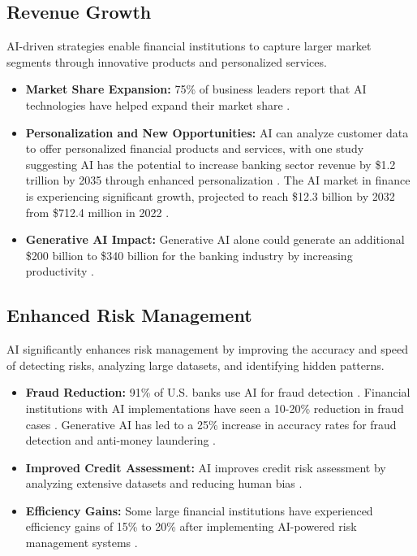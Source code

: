 \subsection{Revenue Growth}
AI-driven strategies enable financial institutions to capture larger market segments through innovative products and personalized services.
\begin{itemize}
    \item \textbf{Market Share Expansion:} 75\% of business leaders report that AI technologies have helped expand their market share \cite{ArtSmart_AI_Finance}.
    \item \textbf{Personalization and New Opportunities:} AI can analyze customer data to offer personalized financial products and services, with one study suggesting AI has the potential to increase banking sector revenue by \$1.2 trillion by 2035 through enhanced personalization \cite{RapidCanvas_AI_Finance}. The AI market in finance is experiencing significant growth, projected to reach \$12.3 billion by 2032 from \$712.4 million in 2022 \cite{ArtSmart_AI_Finance}.
\item \textbf{Generative AI Impact:} Generative AI alone could generate an additional \$200 billion to \$340 billion for the banking industry by increasing productivity \cite{McKinsey_GenAI_Finance}.
\end{itemize}

\subsection{Enhanced Risk Management}
AI significantly enhances risk management by improving the accuracy and speed of detecting risks, analyzing large datasets, and identifying hidden patterns.
\begin{itemize}
    \item \textbf{Fraud Reduction:} 91\% of U.S. banks use AI for fraud detection \cite{ArtSmart_AI_Finance}. Financial institutions with AI implementations have seen a 10-20\% reduction in fraud cases \cite{GiniMachine_AI_Finance}. Generative AI has led to a 25\% increase in accuracy rates for fraud detection and anti-money laundering \cite{MarketUS_GenAI_Finance}.
    \item \textbf{Improved Credit Assessment:} AI improves credit risk assessment by analyzing extensive datasets and reducing human bias \cite{WallStreetPrep_AI_Finance}.
    \item \textbf{Efficiency Gains:} Some large financial institutions have experienced efficiency gains of 15\% to 20\% after implementing AI-powered risk management systems \cite{NetSuite_AI_Finance}.
\end{itemize}

